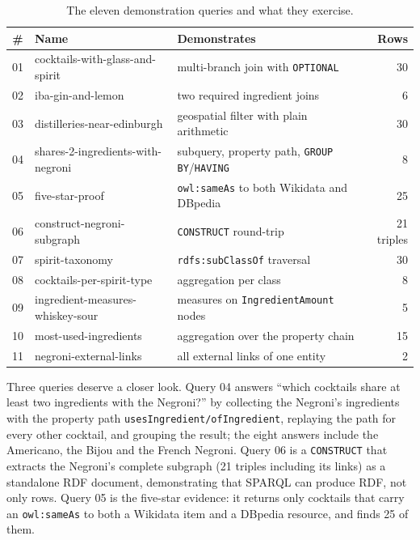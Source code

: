 \begin{table}[h]
  \centering
  \small
  \begin{tabular}{@{}clp{7.6cm}r@{}}
    \toprule
    \# & Name & Demonstrates & Rows \\
    \midrule
    01 & cocktails-with-glass-and-spirit & multi-branch join with \texttt{OPTIONAL} & 30 \\
    02 & iba-gin-and-lemon & two required ingredient joins & 6 \\
    03 & distilleries-near-edinburgh & geospatial filter with plain arithmetic & 30 \\
    04 & shares-2-ingredients-with-negroni & subquery, property path, \texttt{GROUP BY}/\texttt{HAVING} & 8 \\
    05 & five-star-proof & \texttt{owl:sameAs} to both Wikidata and DBpedia & 25 \\
    06 & construct-negroni-subgraph & \texttt{CONSTRUCT} round-trip & 21 triples \\
    07 & spirit-taxonomy & \texttt{rdfs:subClassOf} traversal & 30 \\
    08 & cocktails-per-spirit-type & aggregation per class & 8 \\
    09 & ingredient-measures-whiskey-sour & measures on \texttt{IngredientAmount} nodes & 5 \\
    10 & most-used-ingredients & aggregation over the property chain & 15 \\
    11 & negroni-external-links & all external links of one entity & 2 \\
    \bottomrule
  \end{tabular}
  \caption{The eleven demonstration queries and what they exercise.}
  \label{tab:queries}
\end{table}

Three queries deserve a closer look. Query 04 answers ``which cocktails share
at least two ingredients with the Negroni?'' by collecting the Negroni's
ingredients with the property path
\texttt{usesIngredient/ofIngredient}, replaying the path for every
other cocktail, and grouping the result; the eight answers include the
Americano, the Bijou and the French Negroni. Query 06 is a \texttt{CONSTRUCT}
that extracts the Negroni's complete subgraph (21 triples including its
links) as a standalone RDF document, demonstrating that SPARQL can produce
RDF, not only rows. Query 05 is the five-star evidence: it returns only
cocktails that carry an \texttt{owl:sameAs} to both a Wikidata item and a
DBpedia resource, and finds 25 of them.

